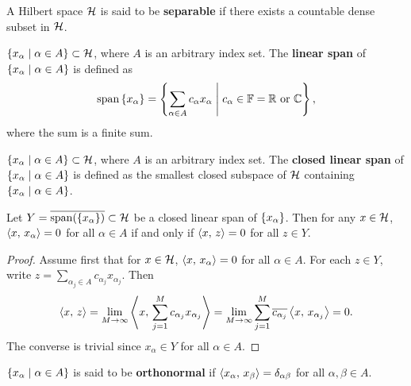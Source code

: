 \begin{definition}
    A Hilbert space $\mathcal{H}$ is said to be \textbf{separable} if there 
    exists a countable dense subset in $\mathcal{H}$.
\end{definition}

\begin{definition}
    $\left\{ x_\alpha \;\middle\vert\; \alpha\in A \right\}\subset\mathcal{H}$, where $A$ is an arbitrary 
    index set. The \textbf{linear span} of $\left\{ x_\alpha \;\middle\vert\; \alpha\in A \right\}$ 
    is defined as 
    \begin{equation*}
        \operatorname{span}\left\{ {x_\alpha} \right\}
        = \left\{ \sum_{\alpha\in A}c_\alpha x_\alpha \;\middle\vert\; c_\alpha\in\mathbb{F} = \mathbb{R} \text{ or } \mathbb{C} \right\},
    \end{equation*}
    where the sum is a finite sum.
\end{definition}

\begin{definition}
    $\left\{ x_\alpha \;\middle\vert\; \alpha\in A \right\}\subset\mathcal{H}$, where $A$ is an arbitrary 
    index set. The \textbf{closed linear span} of $\left\{ x_\alpha \;\middle\vert\; \alpha\in A \right\}$ 
    is defined as the smallest closed subspace of $\mathcal{H}$ containing 
    $\left\{ x_\alpha \;\middle\vert\; \alpha\in A \right\}$.
\end{definition}

\begin{proposition}
    Let $Y = \overline{\operatorname{span}(\left\{ {x_\alpha} \right\})}\subset\mathcal{H}$ be a 
    closed linear span of $\left\{ {x_\alpha} \right\}$. Then for any $x\in\mathcal{H}$, 
    $\left\langle {x},\, {x_\alpha} \right\rangle = 0$ for all $\alpha\in A$ if and only if 
    $\left\langle {x},\, {z} \right\rangle = 0$ for all $z\in Y$.
\end{proposition}
\begin{proof}
    Assume first that for $x\in\mathcal{H}$, $\left\langle {x},\, {x_\alpha} \right\rangle = 0$ for all 
    $\alpha\in A$. For each $z\in Y$, write $z = \sum_{\alpha_j\in A}c_{\alpha_j} x_{\alpha_j}$.  
    Then
    \begin{equation*}
        \left\langle {x},\, {z} \right\rangle = \lim_{M\to\infty}\left\langle {x},\, {\sum_{j = 1}^{M} c_{\alpha_j}x_{\alpha_j}} \right\rangle 
        = \lim_{M\to\infty}\sum_{j = 1}^{M} \overline{c_{\alpha_j}}\left\langle {x},\, {x_{\alpha_j}} \right\rangle = 0.
    \end{equation*}
    The converse is trivial since $x_\alpha\in Y$ for all $\alpha\in A$.
\end{proof}

\begin{definition}
    $\left\{ x_\alpha \;\middle\vert\; \alpha\in A \right\}$ is said to be \textbf{orthonormal} 
    if $\left\langle {x_\alpha},\, {x_\beta} \right\rangle = \delta_{\alpha\beta}$ for all 
    $\alpha,\beta\in A$.
\end{definition}

